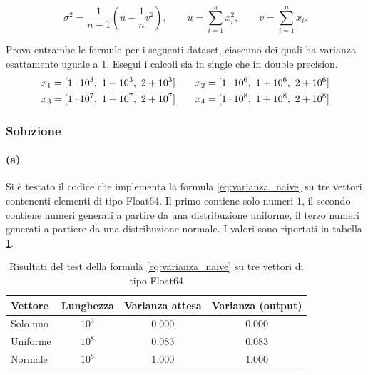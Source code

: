 \documentclass[letterpaper, 12pt]{article}
\numberwithin{equation}{section}    %
\begin{document}
\begin{equation}
    \sigma^2 = \frac{1}{n-1} \left( u - \frac{1}{n}v^2 \right),
    \qquad
    u  = \sum_{i=1}^n x_i^2, 
    \qquad
    v = \sum_{i=1}^n x_i.  
    \label{eq:varianza_eff}  
\end{equation}

Prova entrambe le formule per i seguenti dataset, ciascuno dei quali ha varianza esattamente uguale a 1. 
Esegui i calcoli sia in single che in double precision. 
\begin{align*}
    x_1 &= [ 1\cdot 10^3,\ 1+10^3,\ 2+10^3 ] \qquad
    x_2 = [ 1\cdot 10^6,\ 1+10^6,\ 2+10^6 ] \notag \\
    x_3 &= [ 1\cdot 10^7,\ 1+10^7,\ 2+10^7 ] \qquad
    x_4 = [ 1\cdot 10^8,\ 1+10^8,\ 2+10^8 ]
\end{align*}


\subsubsection{Soluzione}
\paragraph{(a)}Si è testato il codice che implementa la formula \ref{eq:varianza_naive} su tre vettori contenenti
elementi di tipo Float64. Il primo contiene solo numeri $1$, il secondo contiene numeri generati a partire 
da una distribuzione uniforme, il terzo numeri generati a partiere da una distribuzione normale. I valori sono 
riportati in tabella \ref{tab:varianza_test}.

\begin{table}[!ht]
\centering
\caption{Risultati del test della formula \ref{eq:varianza_naive} su tre vettori di tipo Float64}
\label{tab:varianza_test}
\begin{tabular}{|l|c|c|c|}
\hline
\textbf{Vettore} & \textbf{Lunghezza}   & \textbf{Varianza attesa} & \textbf{Varianza (output)} \\
\hline
Solo uno         & $10^3$               & 0.000                    & 0.000                       \\
Uniforme         & $10^8$               & 0.083                    & 0.083                       \\
Normale          & $10^8$               & 1.000                    & 1.000                       \\
\hline
\end{tabular}
\end{table}
\end{document}

